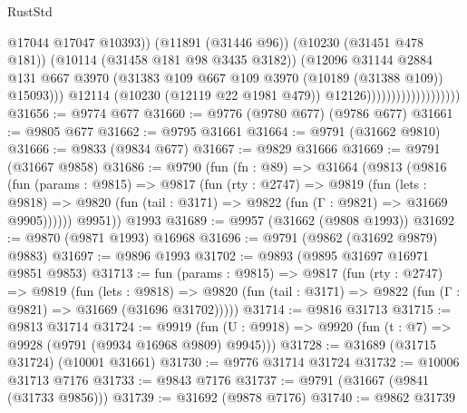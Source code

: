 \begin{lexlean}{RustStd}
\begin{coremodule}
                                                @17044
                                                @17047
                                                @10393))
                                            (@11891 (@31446 @96))
                                            (@10230 (@31451 @478 @181))
                                            (@10114 (@31458 @181 @98 @3435 @3182))
                                            (@12096
                                              @31144
                                              @2884
                                              @131
                                              @667
                                              @3970
                                              (@31383
                                                @109
                                                @667
                                                @109
                                                @3970
                                                (@10189 (@31388 @109))
                                                @15093)))
                                          @12114
                                          (@10230 (@12119 @22 @1981 @479))
                                          @12126)))))))))))))))))))
@31656 := @9774 @677
@31660 := @9776 (@9780 @677) (@9786 @677)
@31661 := @9805 @677
@31662 := @9795 @31661
@31664 := @9791 (@31662 @9810)
@31666 := @9833 (@9834 @677)
@31667 := @9829 @31666
@31669 := @9791 (@31667 @9858)
@31686 := @9790
    (fun (fn : @89) =>
    @31664
      (@9813
        (@9816
          (fun (params : @9815) =>
          @9817
            (fun (rty : @2747) =>
            @9819
              (fun (lets : @9818) =>
              @9820 (fun (tail : @3171) => @9822 (fun (Γ : @9821) => @31669 @9905))))))
        @9951))
    @1993
@31689 := @9957 (@31662 (@9808 @1993))
@31692 := @9870 (@9871 @1993) @16968
@31696 := @9791 (@9862 (@31692 @9879) @9883)
@31697 := @9896 @1993
@31702 := @9893 (@9895 @31697 @16971 @9851 @9853)
@31713 := fun (params : @9815) =>
  @9817
    (fun (rty : @2747) =>
    @9819
      (fun (lets : @9818) =>
      @9820 (fun (tail : @3171) => @9822 (fun (Γ : @9821) => @31669 (@31696 @31702)))))
@31714 := @9816 @31713
@31715 := @9813 @31714
@31724 := @9919
    (fun (U : @9918) => @9920 (fun (t : @7) => @9928 (@9791 (@9934 @16968 @9809) @9945)))
@31728 := @31689 (@31715 @31724) (@10001 @31661)
@31730 := @9776 @31714 @31724
@31732 := @10006 @31713 @7176
@31733 := @9843 @7176
@31737 := @9791 (@31667 (@9841 (@31733 @9856)))
@31739 := @31692 (@9878 @7176)
@31740 := @9862 @31739

\end{coremodule}
\end{lexlean}
